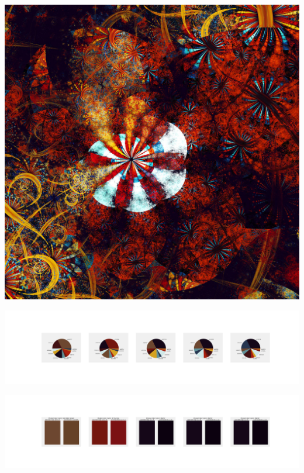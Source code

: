 \documentclass[11pt]{article}
\begin{document}
\begin{landscape}
    \begin{center}
    \includegraphics[width=\textwidth]{./nbimg/file (300).jpg}
    \end{center}

    \begin{center}
    \includegraphics[width=250mm]{./nbimg/pie-224.jpg}
    \end{center}

    \begin{center}
    \includegraphics[width=250mm]{./nbimg/peak-224.jpg}
    \end{center}
    


\end{landscape}
\end{document}

